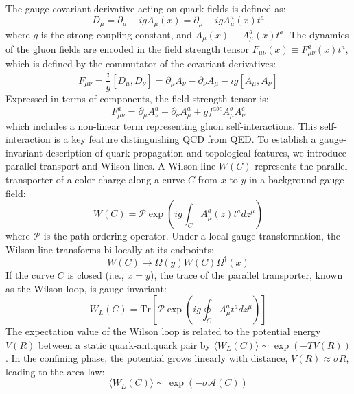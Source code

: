 The gauge covariant derivative acting on quark fields is defined as:
\begin{equation}
D_\mu = \partial_\mu - i g A_\mu(x) = \partial_\mu - i g A_\mu^a(x) t^a
\end{equation}
where $g$ is the strong coupling constant, and $A_\mu(x) \equiv A_\mu^a(x) t^a$. The dynamics of the gluon fields are encoded in the field strength tensor $F_{\mu\nu}(x) \equiv F_{\mu\nu}^a(x) t^a$, which is defined by the commutator of the covariant derivatives:
\begin{equation}
F_{\mu\nu} = \frac{i}{g} [D_\mu, D_\nu] = \partial_\mu A_\nu - \partial_\nu A_\mu - i g [A_\mu, A_\nu]
\end{equation}
Expressed in terms of components, the field strength tensor is:
\begin{equation}
F_{\mu\nu}^a = \partial_\mu A_\nu^a - \partial_\nu A_\mu^a + g f^{abc} A_\mu^b A_\nu^c
\end{equation}
which includes a non-linear term representing gluon self-interactions. This self-interaction is a key feature distinguishing QCD from QED. To establish a gauge-invariant description of quark propagation and topological features, we introduce parallel transport and Wilson lines. A Wilson line $W(C)$ represents the parallel transporter of a color charge along a curve $C$ from $x$ to $y$ in a background gauge field:
\begin{equation}
W(C) = \mathcal{P} \exp \left( i g \int_{C} A_\mu^a (z) t^a dz^\mu \right)
\end{equation}
where $\mathcal{P}$ is the path-ordering operator. Under a local gauge transformation, the Wilson line transforms bi-locally at its endpoints:
\begin{equation}
W(C) \to \Omega(y) W(C) \Omega^\dagger(x)
\end{equation}
If the curve $C$ is closed (i.e., $x = y$), the trace of the parallel transporter, known as the Wilson loop, is gauge-invariant:
\begin{equation}
W_L(C) = \mathrm{Tr} \left[ \mathcal{P} \exp \left( i g \oint_{C} A_\mu^a t^a dz^\mu \right) \right]
\end{equation}
The expectation value of the Wilson loop is related to the potential energy $V(R)$ between a static quark-antiquark pair by $\langle W_L(C) \rangle \sim \exp(-T V(R))$. In the confining phase, the potential grows linearly with distance, $V(R) \approx \sigma R$, leading to the area law:
\begin{equation}
\langle W_L(C) \rangle \sim \exp(-\sigma \mathcal{A}(C))
\end{equation}
